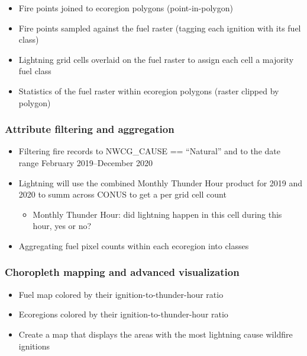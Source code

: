 \documentclass[11pt]{article}
\providecommand{\tightlist}{%
      \setlength{\itemsep}{0pt}\setlength{\parskip}{0pt}}
\begin{document}
\begin{itemize}
\tightlist
\item
  Fire points joined to ecoregion polygons (point-in-polygon)
\item
  Fire points sampled against the fuel raster (tagging each ignition
  with its fuel class)
\item
  Lightning grid cells overlaid on the fuel raster to assign each cell a
  majority fuel class
\item
  Statistics of the fuel raster within ecoregion polygons (raster
  clipped by polygon)
\end{itemize}

\hypertarget{attribute-filtering-and-aggregation}{%
\subsubsection{Attribute filtering and
aggregation}\label{attribute-filtering-and-aggregation}}

\begin{itemize}
\tightlist
\item
  Filtering fire records to NWCG\_CAUSE == ``Natural'' and to the date
  range February 2019--December 2020
\item
  Lightning will use the combined Monthly Thunder Hour product for 2019
  and 2020 to summ across CONUS to get a per grid cell count

  \begin{itemize}
  \tightlist
  \item
    Monthly Thunder Hour: did lightning happen in this cell during this
    hour, yes or no?
  \end{itemize}
\item
  Aggregating fuel pixel counts within each ecoregion into classes
\end{itemize}

\hypertarget{choropleth-mapping-and-advanced-visualization}{%
\subsubsection{Choropleth mapping and advanced
visualization}\label{choropleth-mapping-and-advanced-visualization}}

\begin{itemize}
\tightlist
\item
  Fuel map colored by their ignition-to-thunder-hour ratio
\item
  Ecoregions colored by their ignition-to-thunder-hour ratio
\item
  Create a map that displays the areas with the most lightning cause
  wildfire ignitions
\end{itemize}
\end{document}
